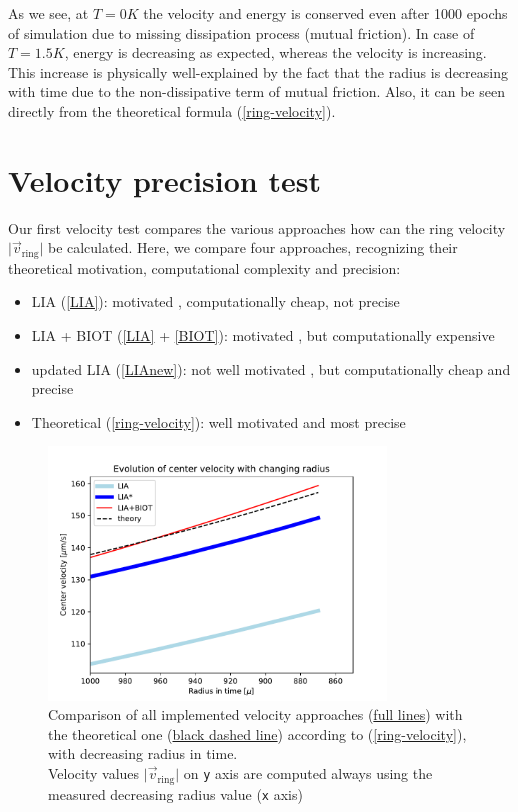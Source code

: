 As we see, at $T=0\unit{K}$ the velocity and energy is conserved even after 1000 epochs of simulation due to missing dissipation process (mutual friction). In case of $T=1.5\unit{K}$, energy is decreasing as expected, whereas the velocity is increasing. This increase is physically well-explained by the fact that the radius is decreasing with time due to the non-dissipative term of mutual friction. Also, it can be seen directly from the theoretical formula (\ref{ring-velocity}).


\section{Velocity precision test}

Our first velocity test compares the various approaches how can the ring velocity $\vert \vec{v}_{\text{ring}} \vert $ be calculated. Here, we compare four approaches, recognizing their theoretical motivation, computational complexity and precision:
\begin{itemize}
	\item LIA (\ref{LIA}): motivated \cite{barenghi}, computationally cheap, not precise
	\item LIA + BIOT (\ref{LIA} + \ref{BIOT}): motivated \cite{barenghi}, but computationally expensive
	\item updated LIA (\ref{LIAnew}): not well motivated \cite{samuels}, but computationally cheap and precise
	\item Theoretical (\ref{ring-velocity}): well motivated \cite{roberts} and most precise
\end{itemize}

\begin{figure}[h]
	\centering
	\includegraphics[width=0.8\textwidth]{graphics/results/vels_radius}
	\caption{Comparison of all implemented velocity approaches (\underline{full lines}) with the theoretical one (\underline{black dashed line}) according to (\ref{ring-velocity}), with decreasing radius in time.\\
	Velocity values $\vert \vec{v}_{\text{ring}} \vert$ on \texttt{y} axis are computed always using the measured decreasing radius value (\texttt{x} axis)}
	\label{vels-radius}
\end{figure}

